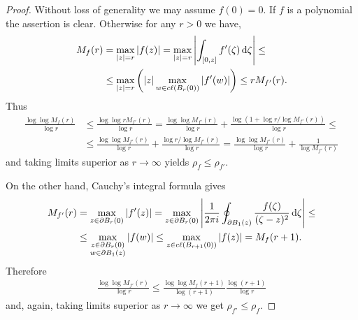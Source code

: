 \begin{proof}
    Without loss of generality we may assume $f(0) = 0$. If $f$ is a polynomial the assertion is clear. Otherwise for any $r > 0$ we have,
    \begin{align*}
        M_f(r) &= \max_{\vert z \vert = r} \vert f(z) \vert = \max_{\vert z \vert = r} \left\vert \int_{[0, z]} f'(\zeta) \mathop{}\!\mathrm{d} \zeta \right\vert \leq \\
        &\leq \max_{\vert z \vert = r} \left( \vert z \vert \max_{w \in c\ell({B_r(0)})} \vert f'(w) \vert \right) \leq r M_{f'}(r).
    \end{align*}
    Thus
    \begin{align*}
        \frac{\log \log M_f(r)}{\log r} &\leq \frac{\log \log r M_{f'}(r)}{\log r} = \frac{\log \log M_{f'}(r)}{\log r} + \frac{\log(1 + \log r / \log M_{f'}(r))}{\log r} \leq \\
        &\leq \frac{\log \log M_{f'}(r)}{\log r} + \frac{\log r / \log M_{f'}(r)}{\log r} = \frac{\log \log M_{f'}(r)}{\log r} + \frac{1}{\log M_{f'}(r)}
    \end{align*}
    and taking limits superior as $r \to \infty$ yields $\rho_f \leq \rho_{f'}$.

    On the other hand, Cauchy's integral formula gives
    \begin{align*}
        M_{f'}(r) &= \max_{z \in \partial B_r(0)} \vert f'(z) \vert = \max_{z \in \partial B_r(0)} \left\vert \frac{1}{2\pi i} \oint_{\partial B_1(z)} \frac{f(\zeta)}{(\zeta-z)^2} \mathop{}\!\mathrm{d} \zeta \right\vert \leq \\
        &\leq \max_{\substack{z \in \partial B_r(0) \\ w \in \partial B_1(z)}} \vert f(w) \vert \leq \max_{z \in c\ell({B_{r+1}(0)})} \vert f(z) \vert = M_f(r + 1).
    \end{align*}
    Therefore
    \begin{align*}
        \frac{\log \log M_{f'}(r)}{\log r} \leq \frac{\log \log M_f(r+1)}{\log (r+1)} \frac{\log (r+1)}{\log r}
    \end{align*}
    and, again, taking limits superior as $r \to \infty$ we get $\rho_{f'} \leq \rho_f$.
\end{proof}